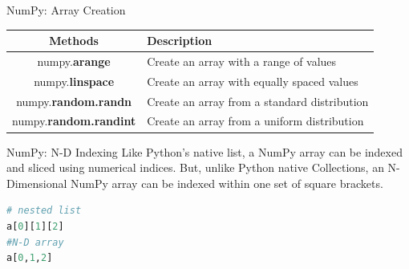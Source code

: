\documentclass{beamer}
\begin{document}
    \begin{frame}[fragile]{NumPy: Array Creation}
        \begin{example}
            \begin{center}
                \begin{tabular}{ | c | p{6.0cm} |}
                    \hline
                    \textbf{Methods} & \textbf{Description} \\
                    \hline
                    numpy.\textbf{arange} & Create an array with a range of values \\
                    numpy.\textbf{linspace} & Create an array with equally spaced values \\
                    numpy.\textbf{random.randn} & Create an array from a standard distribution \\
                    numpy.\textbf{random.randint} & Create an array from a uniform distribution \\
                    \hline
                \end{tabular}
            \end{center}
        \end{example}
    \end{frame}

    \begin{frame}[fragile]{NumPy: N-D Indexing}
        Like Python's native list, a NumPy array can be indexed and sliced using numerical indices. But, unlike Python native Collections, an N-Dimensional NumPy array can be indexed within one set of square brackets.
        \begin{example}
            \begin{lstlisting}[language=Python]
# nested list
a[0][1][2]
#N-D array
a[0,1,2]
            \end{lstlisting}
        \end{example}
    \end{frame}
\end{document}
